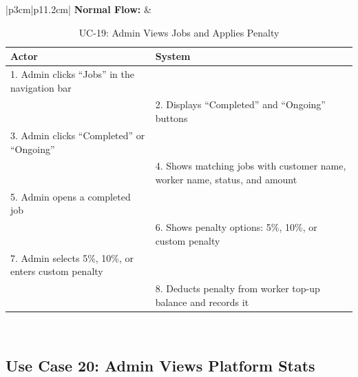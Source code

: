 {\small
\renewcommand{\arraystretch}{1.05}
\begin{table}[H]
\centering
\begin{tabular}{|p{3cm}|p{11.2cm}|}
\hline
\textbf{Normal Flow:} &
\begin{tabular}[t]{|p{5.4cm}|p{5.4cm}|}
\hline
\textbf{Actor} & \textbf{System} \\ \hline
1. Admin clicks ``Jobs'' in the navigation bar & \\ \hline
 & 2. Displays ``Completed'' and ``Ongoing'' buttons \\ \hline
3. Admin clicks ``Completed'' or ``Ongoing'' & \\ \hline
 & 4. Shows matching jobs with customer name, worker name, status, and amount \\ \hline
5. Admin opens a completed job & \\ \hline
 & 6. Shows penalty options: 5\%, 10\%, or custom penalty \\ \hline
7. Admin selects 5\%, 10\%, or enters custom penalty & \\ \hline
 & 8. Deducts penalty from worker top-up balance and records it \\ \hline
\end{tabular} \\ \hline
\end{tabular}
\caption{UC-19: Admin Views Jobs and Applies Penalty}
\end{table}
}

\newpage

\subsection*{Use Case 20: Admin Views Platform Stats}

